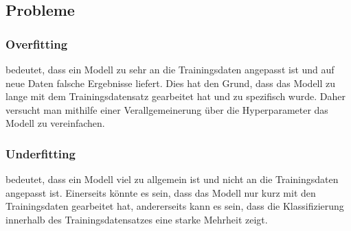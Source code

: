 \subsection{Probleme}

\subsubsection{Overfitting} \label{overfitting} bedeutet, dass ein Modell zu sehr an die Trainingsdaten angepasst ist und auf neue Daten falsche Ergebnisse liefert. Dies hat den Grund, dass das Modell zu lange mit dem Trainingsdatensatz gearbeitet hat und zu spezifisch wurde. Daher versucht man mithilfe einer Verallgemeinerung über die Hyperparameter das Modell zu vereinfachen.

\subsubsection{Underfitting} bedeutet, dass ein Modell viel zu allgemein ist und nicht an die Trainingsdaten angepasst ist. Einerseits könnte es sein, dass das Modell nur kurz mit den Trainingsdaten gearbeitet hat, andererseits kann es sein, dass die Klassifizierung innerhalb des Trainingsdatensatzes eine starke Mehrheit zeigt. \cite{OFUF}